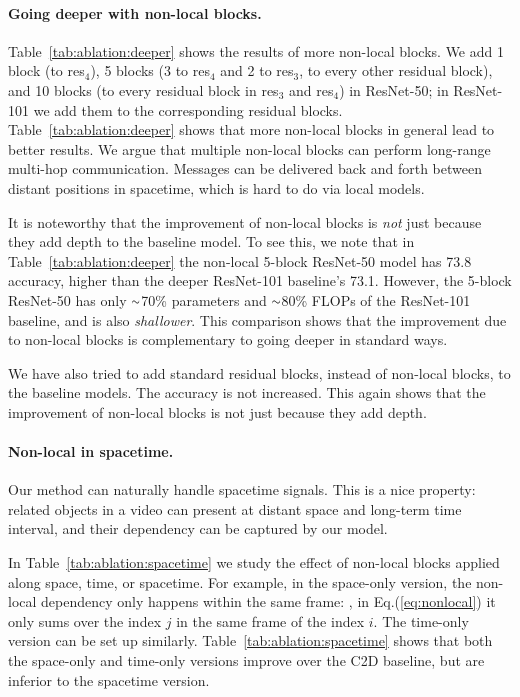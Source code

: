 \documentclass[10pt,twocolumn,letterpaper]{article}
\newcommand{\app}{\raise.17ex\hbox{$\scriptstyle\sim$}}
\begin{document}
\paragraph{Going deeper with non-local blocks.} Table~\ref{tab:ablation:deeper} shows the results of more non-local blocks. We add 1 block (to res$_4$), 5 blocks (3 to res$_4$ and 2 to res$_3$, to every other residual block), and 10 blocks (to every residual block in res$_3$ and res$_4$) in ResNet-50; in ResNet-101 we add them to the corresponding residual blocks. Table~\ref{tab:ablation:deeper} shows that more non-local blocks in general lead to better results.
We argue that multiple non-local blocks can perform long-range multi-hop communication. Messages can be delivered back and forth between distant positions in spacetime, which is hard to do via local models.

It is noteworthy that the improvement of non-local blocks is \emph{not} just because they add depth to the baseline model. To see this, we note that in Table~\ref{tab:ablation:deeper} the non-local 5-block ResNet-50 model has 73.8 accuracy, higher than the deeper ResNet-101 baseline's 73.1. However, the 5-block ResNet-50 has only $\app$70\% parameters and $\app$80\% FLOPs of the ResNet-101 baseline, and is also \emph{shallower}. This comparison shows that the improvement due to non-local blocks is complementary to going deeper in standard ways.

We have also tried to add standard residual blocks, instead of non-local blocks, to the baseline models. The accuracy is not increased. This again shows that the improvement of non-local blocks is not just because they add depth.

\paragraph{Non-local in spacetime.} Our method can naturally handle spacetime signals. This is a nice property: related objects in a video can present at distant space and long-term time interval, and their dependency can be captured by our model.

In Table~\ref{tab:ablation:spacetime} we study the effect of non-local blocks applied along space, time, or spacetime. For example, in the space-only version, the non-local dependency only happens within the same frame: \ie, in Eq.(\ref{eq:nonlocal}) it only sums over the index $j$ in the same frame of the index $i$. The time-only version can be set up similarly. Table~\ref{tab:ablation:spacetime} shows that both the space-only and time-only versions improve over the C2D baseline, but are inferior to the spacetime version.
\end{document}
